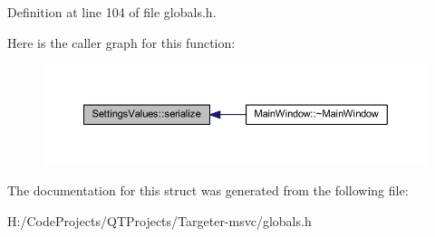 Definition at line 104 of file globals.\+h.

Here is the caller graph for this function\+:
\nopagebreak
\begin{figure}[H]
\begin{center}
\leavevmode
\includegraphics[width=350pt]{struct_settings_values_ad4544b482570ff509c6afef78071a003_icgraph}
\end{center}
\end{figure}


The documentation for this struct was generated from the following file\+:\begin{DoxyCompactItemize}
\item 
H\+:/\+Code\+Projects/\+Q\+T\+Projects/\+Targeter-\/msvc/globals.\+h\end{DoxyCompactItemize}

